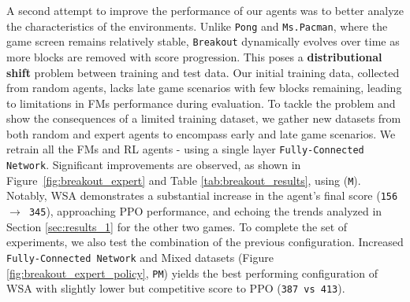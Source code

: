 A second attempt to improve the performance of our agents was to better analyze the characteristics of the environments.
Unlike \texttt{Pong} and \texttt{Ms.Pacman}, where the game screen remains relatively stable, \texttt{Breakout} dynamically evolves over time as more blocks are removed with score progression.
This poses a \textbf{distributional shift} problem between training and test data.
Our initial training data, collected from random agents, lacks late game scenarios with few blocks remaining, leading to limitations in FMs performance during evaluation.
To tackle the problem and show the consequences of a limited training dataset, we gather new datasets from both random and expert agents to encompass early and late game scenarios.
We retrain all the FMs and RL agents - using a single layer \texttt{Fully-Connected Network}.
Significant improvements are observed, as shown in Figure~\ref{fig:breakout_expert} and Table \ref{tab:breakout_results}, using (\texttt{M}).
Notably, WSA demonstrates a substantial increase in the agent's final score (\texttt{156 $\rightarrow$ 345}), approaching PPO performance, and echoing the trends analyzed in Section \ref{sec:results_1} for the other two games.
To complete the set of experiments, we also test the combination of the previous configuration.
Increased \texttt{Fully-Connected Network} and Mixed datasets (Figure \ref{fig:breakout_expert_policy}, \texttt{PM}) yields the best performing configuration of WSA with slightly lower but competitive score to PPO (\texttt{387 vs 413}).











